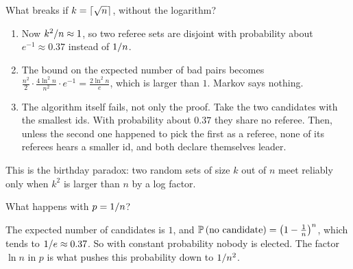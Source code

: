 \begin{exercisebox}
\begin{pproblem}\label{pp:leader-sqrt}
    What breaks if $k = \left\lceil\sqrt{n}\right\rceil$, without the logarithm?
\end{pproblem}
\tcblower
\begin{wsolution}
    \leavevmode
    \begin{enumerate}
        \item Now $k^2/n \approx 1$, so two referee sets are disjoint with probability about
              $e^{-1} \approx 0.37$ instead of $1/n$.
        \item The bound on the expected number of bad pairs becomes
              $\frac{n^2}{2} \cdot \frac{4 \ln^2 n}{n^2} \cdot e^{-1} = \frac{2 \ln^2 n}{e}$, which is
              larger than $1$. Markov says nothing.
        \item The algorithm itself fails, not only the proof. Take the two candidates with the
              smallest ids. With probability about $0.37$ they share no referee. Then, unless the
              second one happened to pick the first as a referee, none of its referees hears a
              smaller id, and both declare themselves leader.
    \end{enumerate}
    This is the birthday paradox: two random sets of size $k$ out of $n$ meet reliably only when
    $k^2$ is larger than $n$ by a log factor.
\end{wsolution}
\end{exercisebox}

\begin{exercisebox}
\begin{pproblem}\label{pp:leader-few}
    What happens with $p = 1/n$?
\end{pproblem}
\tcblower
\begin{wsolution}
    The expected number of candidates is $1$, and
    $\operatorname{\mathbb{P}}\left(\text{no candidate}\right) = \left(1 - \frac{1}{n}\right)^n$, which tends to
    $1/e \approx 0.37$. So with constant probability nobody is elected. The factor $\ln n$
    in $p$ is what pushes this probability down to $1/n^2$.
\end{wsolution}
\end{exercisebox}

